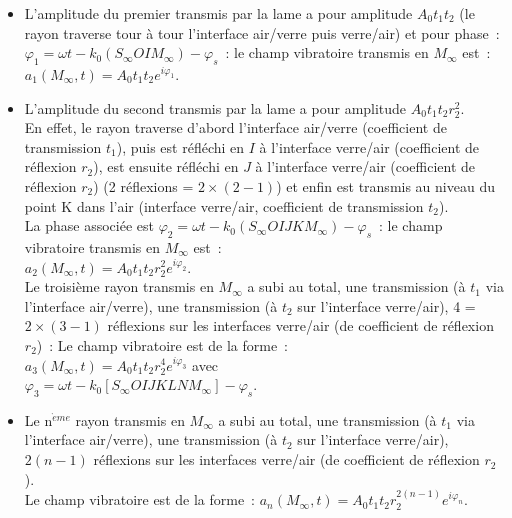 \documentclass{article}
\begin{document}
\begin{itemize}
\item L'amplitude du premier transmis par la lame a pour amplitude
$A_{0}t_{1}t_{2}$ (le rayon traverse tour à tour l'interface
air/verre puis verre/air) et pour phase : $\varphi_{1} = \omega t
-k_{0}\left(S_{\mathrm{\infty}}OIM_{\mathrm{\infty}}\right)-\varphi_{s}$ : le champ vibratoire
transmis en $M_{\mathrm{\infty}}$ est : $a_{1}\left(M_{\mathrm{\infty}},t\right) =
A_{0}t_{1}t_{2}e^{i\varphi_{1}}$.
\item L'amplitude du second
transmis par la lame a pour amplitude $A_{0}t_{1}t_{2}r_{2}^{2}$.
\\
En effet, le rayon traverse d'abord l'interface air/verre
(coefficient de transmission $t_{1}$), puis est réfléchi en $I$ à
l'interface verre/air (coefficient de réflexion $r_{2}$), est
ensuite réfléchi en $J$ à l'interface verre/air (coefficient de
réflexion $r_{2}$) (2 réflexions = $2\times (2-1)$) et enfin est
transmis au niveau du point K dans l'air (interface verre/air,
coefficient de transmission $t_{2}$).
\\
La phase associée est $\varphi_{2} = \omega t
-k_{0}\left(S_{\mathrm{\infty}}OIJKM_{\mathrm{\infty}}\right)-\varphi_{s}$ : le champ vibratoire
transmis en $M_{\mathrm{\infty}}$ est : \\
$a_{2}\left(M_{\mathrm{\infty}},t\right) =
A_{0}t_{1}t_{2}r_{2}^{2}e^{i\varphi_{2}}$. \\
Le troisième rayon transmis en $M_{\mathrm{\infty}}$ a subi au total, une
transmission (à $t_{1}$ via l'interface air/verre), une transmission
(à $t_{2}$ sur l'interface verre/air), 4 = $2\times (3-1)$
réflexions sur les interfaces verre/air (de coefficient de réflexion
$r_{2}$) : Le champ vibratoire est de la forme : \\
$a_{3}\left(M_{\mathrm{\infty}},t\right) = A_{0}t_{1}t_{2}r_{2}^{4}e^{i\varphi_{3}}$
avec \\
$\varphi_{3} = \omega t -
k_{0}\left[S_{\mathrm{\infty}}OIJKLNM_{\mathrm{\infty}}\right]-\varphi_{s}$.
\item Le n$^{\grave{e}me}$ rayon transmis en $M_{\mathrm{\infty}}$ a subi au total, une
transmission (à $t_{1}$ via l'interface air/verre), une transmission
(à $t_{2}$ sur l'interface verre/air), $2(n-1)$ réflexions sur les
interfaces verre/air (de coefficient de réflexion $r_{2}$). \\
Le
champ vibratoire est de la forme : $a_{n}\left(M_{\mathrm{\infty}},t\right) =
A_{0}t_{1}t_{2}r_{2}^{2(n-1)}e^{i\varphi_{n}}$.
\end{itemize}
\end{document}
